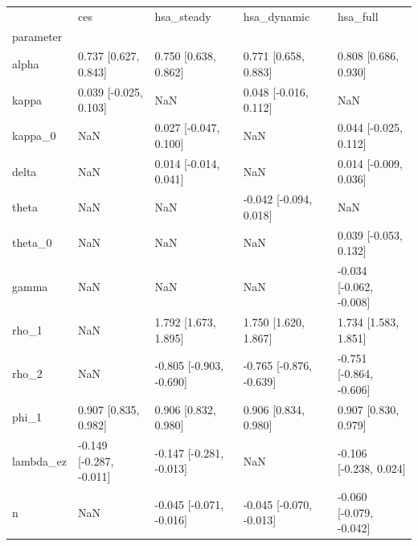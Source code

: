 \begin{tabular}{lllll}
\toprule
 & ces & hsa\_steady & hsa\_dynamic & hsa\_full \\
parameter &  &  &  &  \\
\midrule
alpha & 0.737 [0.627, 0.843] & 0.750 [0.638, 0.862] & 0.771 [0.658, 0.883] & 0.808 [0.686, 0.930] \\
kappa & 0.039 [-0.025, 0.103] & NaN & 0.048 [-0.016, 0.112] & NaN \\
kappa\_0 & NaN & 0.027 [-0.047, 0.100] & NaN & 0.044 [-0.025, 0.112] \\
delta & NaN & 0.014 [-0.014, 0.041] & NaN & 0.014 [-0.009, 0.036] \\
theta & NaN & NaN & -0.042 [-0.094, 0.018] & NaN \\
theta\_0 & NaN & NaN & NaN & 0.039 [-0.053, 0.132] \\
gamma & NaN & NaN & NaN & -0.034 [-0.062, -0.008] \\
rho\_1 & NaN & 1.792 [1.673, 1.895] & 1.750 [1.620, 1.867] & 1.734 [1.583, 1.851] \\
rho\_2 & NaN & -0.805 [-0.903, -0.690] & -0.765 [-0.876, -0.639] & -0.751 [-0.864, -0.606] \\
phi\_1 & 0.907 [0.835, 0.982] & 0.906 [0.832, 0.980] & 0.906 [0.834, 0.980] & 0.907 [0.830, 0.979] \\
lambda\_ez & -0.149 [-0.287, -0.011] & -0.147 [-0.281, -0.013] & NaN & -0.106 [-0.238, 0.024] \\
n & NaN & -0.045 [-0.071, -0.016] & -0.045 [-0.070, -0.013] & -0.060 [-0.079, -0.042] \\
\bottomrule
\end{tabular}
